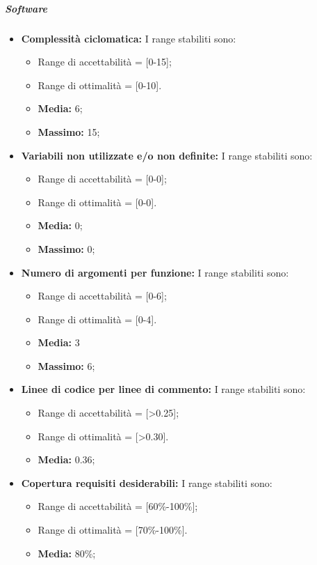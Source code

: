 \subparagraph{Software}
\begin{itemize}
\item \textbf{Complessità ciclomatica: }I range stabiliti sono:
      \begin{itemize}
        \item Range di accettabilità = [0-15];
        \item Range di ottimalità = [0-10].
        \item \textbf{Media: }6;
        \item \textbf{Massimo: }15;
      \end{itemize}

\item \textbf{Variabili non utilizzate e/o non definite: }I range stabiliti sono:
      \begin{itemize}
        \item Range di accettabilità = [0-0];
        \item Range di ottimalità = [0-0].
        \item \textbf{Media: }0;
        \item \textbf{Massimo: }0;
      \end{itemize}

\item \textbf{Numero di argomenti per funzione: }I range stabiliti sono:
      \begin{itemize}
        \item Range di accettabilità = [0-6];
        \item Range di ottimalità = [0-4].
        \item \textbf{Media: }3
        \item \textbf{Massimo: }6;
      \end{itemize}


\item \textbf{Linee di codice per linee di commento: } I range stabiliti sono:
      \begin{itemize}
        \item Range di accettabilità = [>0.25];
        \item Range di ottimalità = [>0.30].
        \item \textbf{Media: }0.36;
      \end{itemize}

\item \textbf{Copertura requisiti desiderabili: }I range stabiliti sono:
      \begin{itemize}
        \item Range di accettabilità = [60\%-100\%];
        \item Range di ottimalità = [70\%-100\%].
        \item \textbf{Media: }80\%;
      \end{itemize}
      

\end{itemize}
